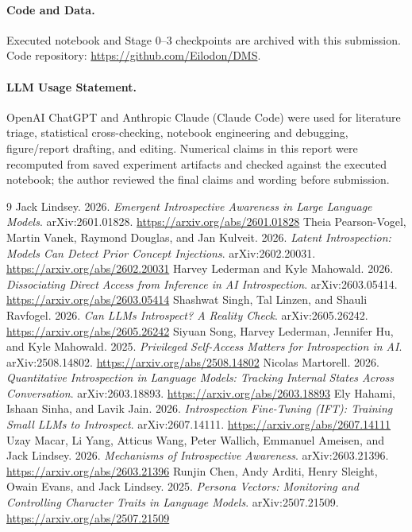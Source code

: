 \documentclass[11pt]{article}
\begin{document}
\paragraph{Code and Data.} Executed notebook and Stage 0--3 checkpoints are archived with this submission. Code repository: \url{https://github.com/Eilodon/DMS}.

\paragraph{LLM Usage Statement.} OpenAI ChatGPT and Anthropic Claude (Claude Code) were used for literature triage, statistical cross-checking, notebook engineering and debugging, figure/report drafting, and editing. Numerical claims in this report were recomputed from saved experiment artifacts and checked against the executed notebook; the author reviewed the final claims and wording before submission.

\begin{thebibliography}{9}
\small
{} Jack Lindsey. 2026. \emph{Emergent Introspective Awareness in Large Language Models}. arXiv:2601.01828. \url{https://arxiv.org/abs/2601.01828}
 Theia Pearson-Vogel, Martin Vanek, Raymond Douglas, and Jan Kulveit. 2026. \emph{Latent Introspection: Models Can Detect Prior Concept Injections}. arXiv:2602.20031. \url{https://arxiv.org/abs/2602.20031}
 Harvey Lederman and Kyle Mahowald. 2026. \emph{Dissociating Direct Access from Inference in AI Introspection}. arXiv:2603.05414. \url{https://arxiv.org/abs/2603.05414}
 Shashwat Singh, Tal Linzen, and Shauli Ravfogel. 2026. \emph{Can LLMs Introspect? A Reality Check}. arXiv:2605.26242. \url{https://arxiv.org/abs/2605.26242}
 Siyuan Song, Harvey Lederman, Jennifer Hu, and Kyle Mahowald. 2025. \emph{Privileged Self-Access Matters for Introspection in AI}. arXiv:2508.14802. \url{https://arxiv.org/abs/2508.14802}
 Nicolas Martorell. 2026. \emph{Quantitative Introspection in Language Models: Tracking Internal States Across Conversation}. arXiv:2603.18893. \url{https://arxiv.org/abs/2603.18893}
 Ely Hahami, Ishaan Sinha, and Lavik Jain. 2026. \emph{Introspection Fine-Tuning (IFT): Training Small LLMs to Introspect}. arXiv:2607.14111. \url{https://arxiv.org/abs/2607.14111}
 Uzay Macar, Li Yang, Atticus Wang, Peter Wallich, Emmanuel Ameisen, and Jack Lindsey. 2026. \emph{Mechanisms of Introspective Awareness}. arXiv:2603.21396. \url{https://arxiv.org/abs/2603.21396}
 Runjin Chen, Andy Arditi, Henry Sleight, Owain Evans, and Jack Lindsey. 2025. \emph{Persona Vectors: Monitoring and Controlling Character Traits in Language Models}. arXiv:2507.21509. \url{https://arxiv.org/abs/2507.21509}
\end{thebibliography}
\end{document}
